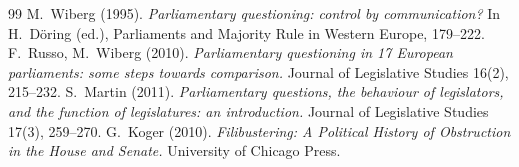 \documentclass[11pt,a4paper]{article}
\begin{document}
\begin{thebibliography}{99}
 M.~Wiberg (1995). \emph{Parliamentary questioning: control by communication?} In H.~Döring (ed.), Parliaments and Majority Rule in Western Europe, 179--222.
 F.~Russo, M.~Wiberg (2010). \emph{Parliamentary questioning in 17 European parliaments: some steps towards comparison.} Journal of Legislative Studies 16(2), 215--232.
 S.~Martin (2011). \emph{Parliamentary questions, the behaviour of legislators, and the function of legislatures: an introduction.} Journal of Legislative Studies 17(3), 259--270.
 G.~Koger (2010). \emph{Filibustering: A Political History of Obstruction in the House and Senate.} University of Chicago Press.
\end{thebibliography}
\end{document}
